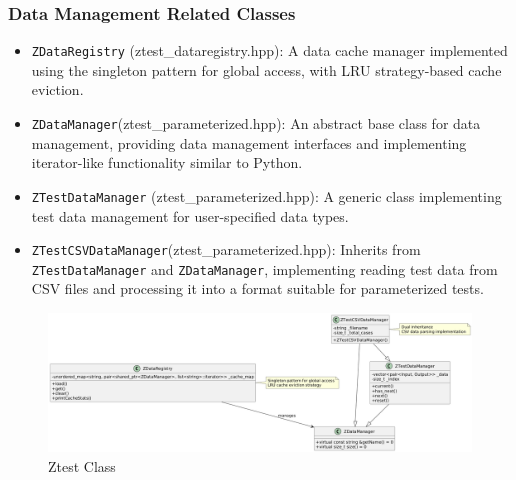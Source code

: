 \documentclass{article}
\begin{document}
\subsubsection{Data Management Related Classes}
\begin{itemize}
    \item \texttt{ZDataRegistry} (ztest\_dataregistry.hpp): A data cache manager implemented using the singleton pattern for global access, with LRU strategy-based cache eviction.
    \item \texttt{ZDataManager}(ztest\_parameterized.hpp): An abstract base class for data management, providing data management interfaces and implementing iterator-like functionality similar to Python.
    \item \texttt{ZTestDataManager} (ztest\_parameterized.hpp): A generic class implementing test data management for user-specified data types.
    \item \texttt{ZTestCSVDataManager}(ztest\_parameterized.hpp): Inherits from \texttt{ZTestDataManager} and \texttt{ZDataManager}, implementing reading test data from CSV files and processing it into a format suitable for parameterized tests.
\end{itemize}
\begin{figure}[H]
    \centering
    \includegraphics[width = \textwidth]{img/c4.png} %
    \caption{ Ztest Class}
    \label{fig:ztest class }
\end{figure}
\end{document}
